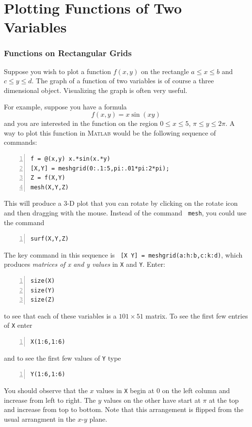 
\chapter{Plotting Functions of Two Variables}



\subsection*{Functions on Rectangular Grids}

Suppose you wish to plot a function $f(x,y)$ on the rectangle
$a \le x \le b$ and $c \le y \le d$. The graph of a function
of two variables is of course a three dimensional object.
Visualizing the graph is often very useful.

For example, suppose you have a formula
$$
f(x,y) = x \sin(xy)
$$
and you are interested in the function on the region $0 \le x \le 5$,
$\pi \le y \le 2 \pi$. A way to plot this function in \textsc{Matlab} would be the following sequence of commands:
\begin{lstlisting}[frame=none,numbers=left]
f = @(x,y) x.*sin(x.*y)
[X,Y] = meshgrid(0:.1:5,pi:.01*pi:2*pi);
Z = f(X,Y)
mesh(X,Y,Z)
\end{lstlisting}
This will produce a 3-D plot that you can rotate by clicking on the
rotate icon and then dragging with the mouse.
%
Instead of the command \verb& mesh&, you could use the command
\begin{lstlisting}[frame=none,numbers=left]
surf(X,Y,Z)
\end{lstlisting}

The key command in this sequence is
\verb& [X Y] = meshgrid(a:h:b,c:k:d)&, which
produces {\em matrices of x and y values} in \verb&X& and \verb&Y&. Enter:
\begin{lstlisting}[frame=none,numbers=left]
size(X)
size(Y)
size(Z)
\end{lstlisting}
to see that each of these variables is a $101 \times 51$ matrix. To
see the first few entries of \verb&X& enter
\begin{lstlisting}[frame=none,numbers=left]
X(1:6,1:6)
\end{lstlisting}
and to see the first few values of \verb&Y& type
\begin{lstlisting}[frame=none,numbers=left]
Y(1:6,1:6)
\end{lstlisting}
You should observe that the $x$ values in \verb&X& begin at $0$ on the
left column and increase from left to right. The $y$ values on the
other have start at $\pi$ at the top and increase from top to bottom.
Note that this arrangement is flipped from the usual arrangment in the
$x$-$y$ plane.

